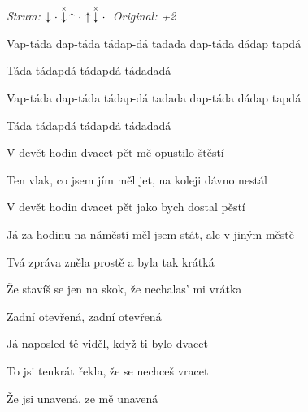 \begin{song}


 \quad
\textit{Strum:} $\Down\Miss\ChuckDown\Up\Miss\Up\ChuckDown\Miss$  \quad
\textit{Original: +2}

\large


\Large

\bigskip

\begin{chorusbox}{\Refren}
Vap-táda dap-táda tádap-dá tadada dap-táda dádap tapdá \par
Táda tádapdá tádapdá tádadadá  \par
{}Vap-táda dap-táda tádap-dá tadada dap-táda dádap tapdá \par
Táda tádapdá tádapdá tádadadá  \par
\end{chorusbox}

\bigskip

V devět hodin dvacet pět  mě opustilo štěstí \par
Ten vlak, co jsem jím měl jet, na koleji  dávno nestál \par
{}V devět hodin dvacet pět  jako bych dostal pěstí \par
Já za hodinu na náměstí měl jsem stát, ale v jiným městě

\bigskip

Tvá zpráva zněla prostě a byla tak krátká \par
Že stavíš se jen na skok, že nechalas' mi vrátka \par
{}Zadní otevřená, zadní otevřená

\bigskip

Já naposled tě viděl, když ti bylo dvacet \par
{}To jsi tenkrát řekla, že se nechceš vracet \par
{}Že jsi unavená, ze mě unavená \par

\bigskip

\Refren

\bigskip


\end{song}
